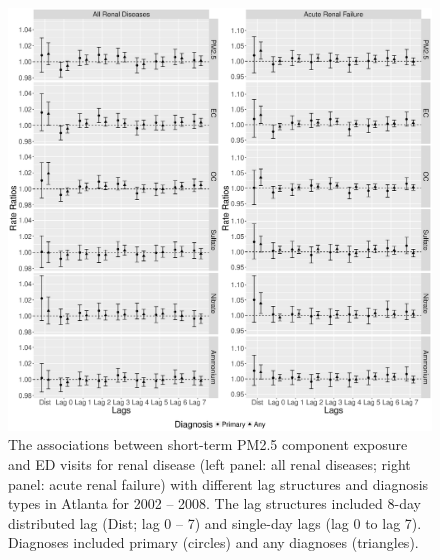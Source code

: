 \documentclass[11pt]{article}
\begin{document}
\begin{figure}[htbp]
\begin{center}
\includegraphics[width=\textwidth]{img/fig3.eps}
\caption{The associations between short-term PM2.5 component exposure and ED visits for renal disease (left panel: all renal diseases; right panel: acute renal failure) with different lag structures and diagnosis types in Atlanta for 2002 -- 2008. The lag structures included 8-day distributed lag (Dist; lag 0 -- 7) and single-day lags (lag 0 to lag 7). Diagnoses included primary (circles) and any diagnoses (triangles).}
\label{fig:renal}
\end{center}
\end{figure}
\end{document}
